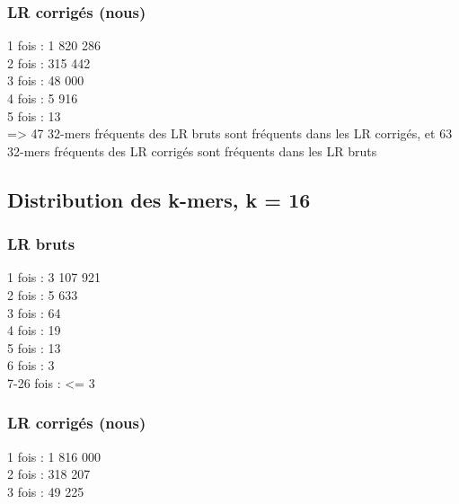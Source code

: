 \documentclass[12pt]{article}
\begin{document}
\subsubsection{LR corrigés (nous)}

1 fois : 1 820 286 \\

2 fois : 315 442 \\

3 fois : 48 000 \\

4 fois : 5 916 \\

5 fois : 13 \\

=> 47 32-mers fréquents des LR bruts sont fréquents dans les LR corrigés, et 63 32-mers fréquents des LR corrigés sont fréquents dans les LR bruts

\subsection{Distribution des k-mers, k = 16}

\subsubsection{LR bruts}

1 fois : 3 107 921 \\

2 fois : 5 633 \\

3 fois : 64 \\

4 fois : 19 \\

5 fois : 13 \\

6 fois : 3 \\

7-26 fois : <= 3 \\

\subsubsection{LR corrigés (nous)}

1 fois : 1 816 000 \\

2 fois : 318 207 \\

3 fois : 49 225 \\
\end{document}
